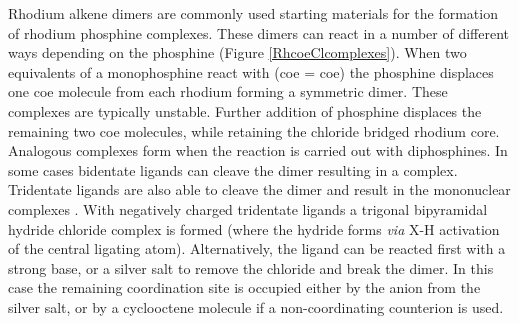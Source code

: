 Rhodium alkene dimers are commonly used starting materials for the formation of rhodium phosphine complexes.  These dimers can react in a number of different ways depending on the phosphine (Figure \ref{RhcoeClcomplexes}).  When two equivalents of a monophosphine react with  (\acrshort{coe} = \acrlong{coe}) the phosphine displaces one \acrshort{coe} molecule from each rhodium forming a symmetric dimer.\cite{Canepa2003}  These complexes are typically unstable.  Further addition of phosphine displaces the remaining two \acrshort{coe} molecules, while retaining the chloride bridged rhodium core.\cite{Bleeke1986}  Analogous complexes form when the reaction is carried out with diphosphines.\cite{Fryzuk1989}  In some cases bidentate ligands can cleave the dimer resulting in a  complex.\cite{Hashimoto2010}  Tridentate ligands are also able to cleave the dimer and result in the mononuclear complexes \ce{[Rh(LLL)Cl]}\cite{Khan1988, Hermann2002}.  With negatively charged tridentate ligands a trigonal bipyramidal hydride chloride complex is formed (where the hydride forms \emph{via} X-H activation of the central ligating atom).\cite{Boom1998, Winter2003, Salem2008}  Alternatively, the ligand can be reacted first with a strong base, or a silver salt to remove the chloride and break the dimer.  In this case the remaining coordination site is occupied either by the anion from the silver salt, or by a cyclooctene molecule if a non-coordinating counterion is used.\cite{Fryzuk1986, Hanson2008}

